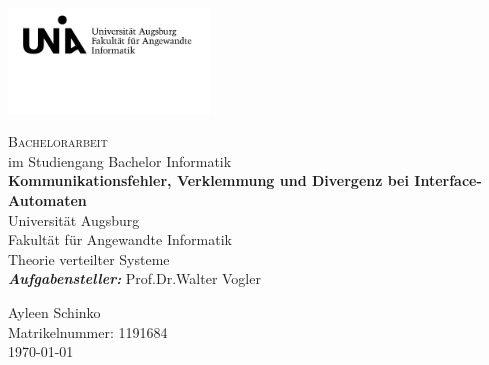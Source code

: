 \begin{titlepage}
\includegraphics[width=0.4\textwidth]{Uni_Aug_Logo_FAI_schwarz.png}
\vspace{-1cm}
\begin{center}
  \LARGE \textsc{Bachelorarbeit}\\
  \normalsize im Studiengang Bachelor Informatik\\
  \vfill
  \Huge \textbf{Kommunikationsfehler, Verklemmung und Divergenz bei
  Interface-Automaten}\\
  \vfill
  \LARGE \sffamily Universität Augsburg\\
  Fakultät für Angewandte Informatik\\
  Theorie verteilter Systeme\\
  \vspace{2cm}
  \rmfamily \large \textit{\textbf{Aufgabensteller:}} Prof.\;Dr.\;Walter Vogler
\end{center}
\vspace{1.5cm}
\large %
Ayleen Schinko\\
Matrikelnummer: 1191684\\
\today
\end{titlepage}
